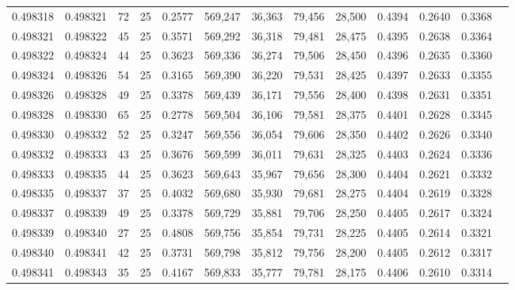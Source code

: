 \begin{tabular}{rrrrrrrrrrrrr}
0.498318 & 0.498321 &    72 &  25 &                                     0.2577 & 569,247 &  36,363 &  79,456 &  28,500 & 0.4394 & 0.2640 & 0.3368 \\
0.498321 & 0.498322 &    45 &  25 &                                     0.3571 & 569,292 &  36,318 &  79,481 &  28,475 & 0.4395 & 0.2638 & 0.3364 \\
0.498322 & 0.498324 &    44 &  25 &                                     0.3623 & 569,336 &  36,274 &  79,506 &  28,450 & 0.4396 & 0.2635 & 0.3360 \\
0.498324 & 0.498326 &    54 &  25 &                                     0.3165 & 569,390 &  36,220 &  79,531 &  28,425 & 0.4397 & 0.2633 & 0.3355 \\
0.498326 & 0.498328 &    49 &  25 &                                     0.3378 & 569,439 &  36,171 &  79,556 &  28,400 & 0.4398 & 0.2631 & 0.3351 \\
0.498328 & 0.498330 &    65 &  25 &                                     0.2778 & 569,504 &  36,106 &  79,581 &  28,375 & 0.4401 & 0.2628 & 0.3345 \\
0.498330 & 0.498332 &    52 &  25 &                                     0.3247 & 569,556 &  36,054 &  79,606 &  28,350 & 0.4402 & 0.2626 & 0.3340 \\
0.498332 & 0.498333 &    43 &  25 &                                     0.3676 & 569,599 &  36,011 &  79,631 &  28,325 & 0.4403 & 0.2624 & 0.3336 \\
0.498333 & 0.498335 &    44 &  25 &                                     0.3623 & 569,643 &  35,967 &  79,656 &  28,300 & 0.4404 & 0.2621 & 0.3332 \\
0.498335 & 0.498337 &    37 &  25 &                                     0.4032 & 569,680 &  35,930 &  79,681 &  28,275 & 0.4404 & 0.2619 & 0.3328 \\
0.498337 & 0.498339 &    49 &  25 &                                     0.3378 & 569,729 &  35,881 &  79,706 &  28,250 & 0.4405 & 0.2617 & 0.3324 \\
0.498339 & 0.498340 &    27 &  25 &                                     0.4808 & 569,756 &  35,854 &  79,731 &  28,225 & 0.4405 & 0.2614 & 0.3321 \\
0.498340 & 0.498341 &    42 &  25 &                                     0.3731 & 569,798 &  35,812 &  79,756 &  28,200 & 0.4405 & 0.2612 & 0.3317 \\
0.498341 & 0.498343 &    35 &  25 &                                     0.4167 & 569,833 &  35,777 &  79,781 &  28,175 & 0.4406 & 0.2610 & 0.3314 \\

\end{tabular}
